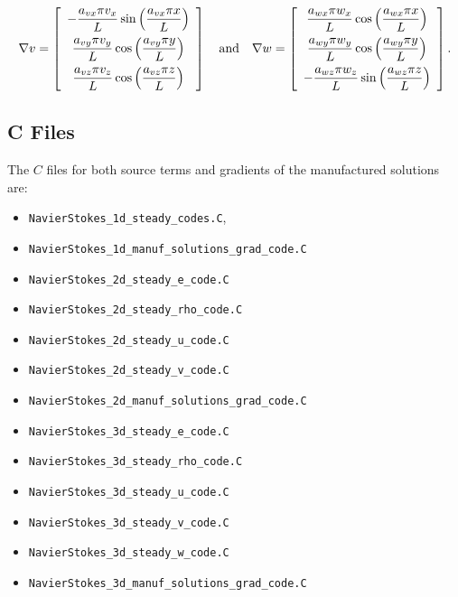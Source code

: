 \documentclass[10pt]{article}
\begin{document}
\begin{equation*}
\nabla  v= \left[ \begin{array}{c}
-  \dfrac{  a_{vx}  \pi v_x}{L}  \sin\left( \dfrac{ a_{vx}  \pi  x}{L}\right)\vspace{5pt}\\
    \dfrac{  a_{vy}  \pi v_y}{L} \cos\left( \dfrac{ a_{vy}  \pi  y}{L}\right)\vspace{5pt}\\
   \dfrac{  a_{vz}  \pi v_z }{L} \cos\left( \dfrac{ a_{vz}  \pi  z}{L}\right)
\end{array} \right]
\quad\mbox{and}\quad
\nabla w = \left[ \begin{array}{c}
\dfrac{  a_{wx}  \pi  w_x}{L} \cos\left( \dfrac{ a_{wx}  \pi  x}{L}\right)\vspace{5pt}\\
  \dfrac{  a_{wy}  \pi w_y}{L}  \cos\left( \dfrac{ a_{wy}  \pi  y}{L}\right)\vspace{5pt} \\
 - \dfrac{  a_{wz}  \pi w_z}{L}  \sin\left( \dfrac{ a_{wz}  \pi  z}{L}\right)
\end{array} \right].
\end{equation*}


\subsection{C Files}
The $C$ files for both source terms and gradients of the  manufactured solutions are:
\begin{itemize}
 \item \texttt{NavierStokes\_1d\_steady\_codes.C},
 \item \texttt{NavierStokes\_1d\_manuf\_solutions\_grad\_code.C}
 \item \texttt{NavierStokes\_2d\_steady\_e\_code.C}
 \item \texttt{NavierStokes\_2d\_steady\_rho\_code.C}
 \item \texttt{NavierStokes\_2d\_steady\_u\_code.C}
 \item \texttt{NavierStokes\_2d\_steady\_v\_code.C}
 \item \texttt{NavierStokes\_2d\_manuf\_solutions\_grad\_code.C}
 \item \texttt{NavierStokes\_3d\_steady\_e\_code.C}
 \item \texttt{NavierStokes\_3d\_steady\_rho\_code.C}
 \item \texttt{NavierStokes\_3d\_steady\_u\_code.C}
 \item \texttt{NavierStokes\_3d\_steady\_v\_code.C}
 \item \texttt{NavierStokes\_3d\_steady\_w\_code.C}
 \item \texttt{NavierStokes\_3d\_manuf\_solutions\_grad\_code.C}
\end{itemize}
\end{document}
